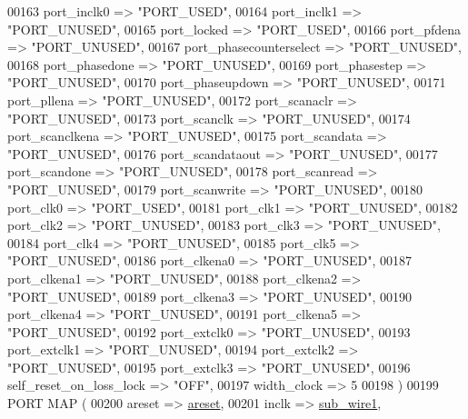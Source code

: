 \begin{DoxyCode}
{00163         port\_inclk0 => \textcolor{keyword}{"PORT\_USED"},
00164         port\_inclk1 => \textcolor{keyword}{"PORT\_UNUSED"},
00165         port\_locked => \textcolor{keyword}{"PORT\_USED"},
00166         port\_pfdena => \textcolor{keyword}{"PORT\_UNUSED"},
00167         port\_phasecounterselect => \textcolor{keyword}{"PORT\_UNUSED"},
00168         port\_phasedone => \textcolor{keyword}{"PORT\_UNUSED"},
00169         port\_phasestep => \textcolor{keyword}{"PORT\_UNUSED"},
00170         port\_phaseupdown => \textcolor{keyword}{"PORT\_UNUSED"},
00171         port\_pllena => \textcolor{keyword}{"PORT\_UNUSED"},
00172         port\_scanaclr => \textcolor{keyword}{"PORT\_UNUSED"},
00173         port\_scanclk => \textcolor{keyword}{"PORT\_UNUSED"},
00174         port\_scanclkena => \textcolor{keyword}{"PORT\_UNUSED"},
00175         port\_scandata => \textcolor{keyword}{"PORT\_UNUSED"},
00176         port\_scandataout => \textcolor{keyword}{"PORT\_UNUSED"},
00177         port\_scandone => \textcolor{keyword}{"PORT\_UNUSED"},
00178         port\_scanread => \textcolor{keyword}{"PORT\_UNUSED"},
00179         port\_scanwrite => \textcolor{keyword}{"PORT\_UNUSED"},
00180         port\_clk0 => \textcolor{keyword}{"PORT\_USED"},
00181         port\_clk1 => \textcolor{keyword}{"PORT\_UNUSED"},
00182         port\_clk2 => \textcolor{keyword}{"PORT\_UNUSED"},
00183         port\_clk3 => \textcolor{keyword}{"PORT\_UNUSED"},
00184         port\_clk4 => \textcolor{keyword}{"PORT\_UNUSED"},
00185         port\_clk5 => \textcolor{keyword}{"PORT\_UNUSED"},
00186         port\_clkena0 => \textcolor{keyword}{"PORT\_UNUSED"},
00187         port\_clkena1 => \textcolor{keyword}{"PORT\_UNUSED"},
00188         port\_clkena2 => \textcolor{keyword}{"PORT\_UNUSED"},
00189         port\_clkena3 => \textcolor{keyword}{"PORT\_UNUSED"},
00190         port\_clkena4 => \textcolor{keyword}{"PORT\_UNUSED"},
00191         port\_clkena5 => \textcolor{keyword}{"PORT\_UNUSED"},
00192         port\_extclk0 => \textcolor{keyword}{"PORT\_UNUSED"},
00193         port\_extclk1 => \textcolor{keyword}{"PORT\_UNUSED"},
00194         port\_extclk2 => \textcolor{keyword}{"PORT\_UNUSED"},
00195         port\_extclk3 => \textcolor{keyword}{"PORT\_UNUSED"},
00196         self\_reset\_on\_loss\_lock => \textcolor{keyword}{"OFF"},
00197         width\_clock => \textcolor{vhdllogic}{5}
00198     \textcolor{vhdlchar}{)}
00199     \textcolor{keywordflow}{PORT} \textcolor{keywordflow}{MAP} (
00200         areset => \hyperlink{classpll_a5ff6e3af321d94570fc485fa1bce5a06}{areset},
00201         inclk => \hyperlink{classpll_1_1_s_y_n_a325f96af17ccfcff0f437d73da993aff}{sub\_wire1},
}
\end{DoxyCode}
